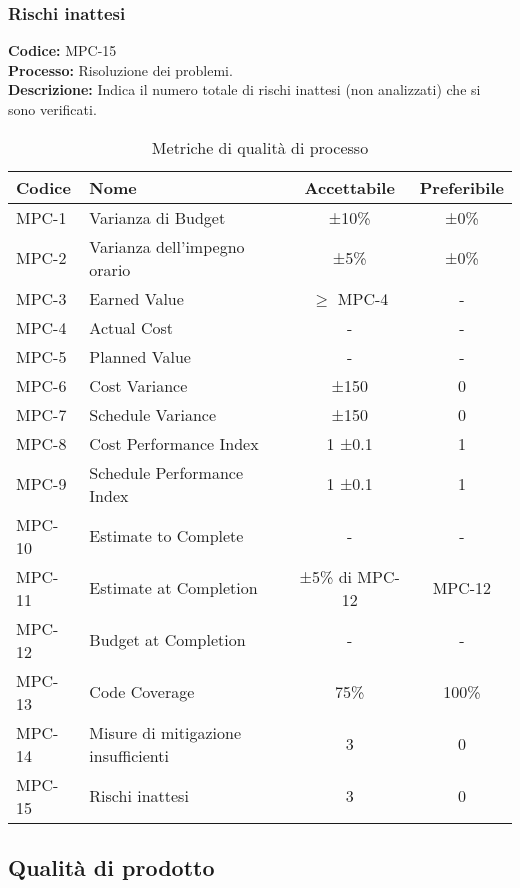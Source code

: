 \subsubsection{Rischi inattesi}
\textbf{Codice:} MPC-15 \\
\textbf{Processo:} Risoluzione dei problemi. \\
\textbf{Descrizione:} Indica il numero totale di rischi inattesi (non analizzati) che si sono verificati.

\begin{table}[h!]
    \centering
    \renewcommand{\arraystretch}{1.5}
    \setlength{\tabcolsep}{5pt}
    \begin{tabularx}{\textwidth}{|l|X|c|c|}
    \hline
    \rowcolor[HTML]{FFD700}
    \textbf{Codice} & \textbf{Nome} & \textbf{Accettabile} & \textbf{Preferibile} \\ \hline
    MPC-1 & Varianza di Budget & ±10\% & ±0\% \\ \hline
    MPC-2 & Varianza dell’impegno orario & ±5\% & ±0\% \\ \hline
    MPC-3 & Earned Value & \(\geq\) MPC-4 & - \\ \hline
    MPC-4 & Actual Cost & - & - \\ \hline
    MPC-5 & Planned Value & - & - \\ \hline
    MPC-6 & Cost Variance & ±150 & 0 \\ \hline
    MPC-7 & Schedule Variance & ±150 & 0 \\ \hline
    MPC-8 & Cost Performance Index & 1 ±0.1 & 1 \\ \hline
    MPC-9 & Schedule Performance Index & 1 ±0.1 & 1 \\ \hline
    MPC-10 & Estimate to Complete & - & - \\ \hline
    MPC-11 & Estimate at Completion & ±5\% di MPC-12 & MPC-12 \\ \hline
    MPC-12 & Budget at Completion & - & - \\ \hline
    MPC-13 & Code Coverage & 75\% & 100\% \\ \hline
    MPC-14 & Misure di mitigazione insufficienti & 3 & 0 \\ \hline
    MPC-15 & Rischi inattesi & 3 & 0 \\ \hline
    \end{tabularx}
    \caption{Metriche di qualità di processo}
    \label{tab:metriche-qualita-processo}
\end{table}



\subsection{Qualità di prodotto}
\label{sec:Qualità di prodotto}

